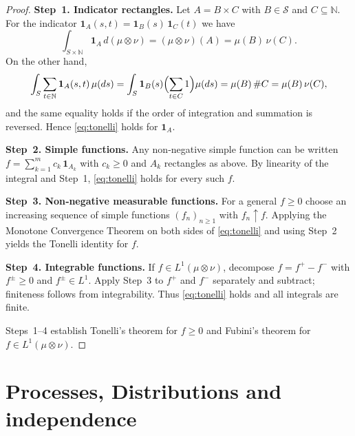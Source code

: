 \documentclass[11pt]{article}
\begin{document}
\begin{proof}
\break
\textbf{Step 1. Indicator rectangles.}\;
Let \(A=B\times C\) with \(B\in\mathcal{S}\) and \(C\subseteq\mathbb{N}\).
For the indicator \(\mathbf{1}_{A}(s,t)=\mathbf{1}_{B}(s)\,\mathbf{1}_{C}(t)\) we have
\[
\int_{S\times\mathbb{N}} \mathbf{1}_{A}\,d(\mu\otimes\nu)
   =(\mu\otimes\nu)(A)=\mu(B)\,\nu(C).
\]
On the other hand,
\[
\int_S \sum_{t\in\mathbb{N}}\mathbf{1}_{A}(s,t)\,\mu(ds)
   =\int_S \mathbf{1}_{B}(s)\Bigl(\sum_{t\in C}1\Bigr)\mu(ds)
   =\mu(B)\,\#C
   =\mu(B)\,\nu(C),
\]
and the same equality holds if the order of integration and summation is
reversed.  Hence \eqref{eq:tonelli} holds for \(\mathbf{1}_{A}\).

\smallskip
\textbf{Step 2. Simple functions.}\;
Any non‑negative simple function can be written
\(f=\sum_{k=1}^{m}c_k\,\mathbf{1}_{A_k}\) with \(c_k\ge 0\) and \(A_k\) rectangles
as above.  By linearity of the integral and Step 1, \eqref{eq:tonelli}
holds for every such \(f\).

\smallskip
\textbf{Step 3. Non‑negative measurable functions.}\;
For a general \(f\ge 0\) choose an increasing sequence of simple
functions \((f_n)_{n\ge 1}\) with \(f_n\uparrow f\).
Applying the Monotone Convergence Theorem on both sides of
\eqref{eq:tonelli} and using Step 2 yields the Tonelli identity for \(f\).

\smallskip
\textbf{Step 4. Integrable functions.}\;
If \(f\in L^{1}(\mu\otimes\nu)\), decompose \(f=f^{+}-f^{-}\) with
\(f^{\pm}\ge 0\) and \(f^{\pm}\in L^{1}\).
Apply Step 3 to \(f^{+}\) and \(f^{-}\) separately and subtract;
finiteness follows from integrability.  Thus \eqref{eq:tonelli} holds
and all integrals are finite.

\smallskip
Steps 1--4 establish Tonelli’s theorem for \(f\ge 0\) and Fubini’s
theorem for \(f\in L^{1}(\mu\otimes\nu)\).
\end{proof}

\section*{Processes, Distributions and independence}
\end{document}
